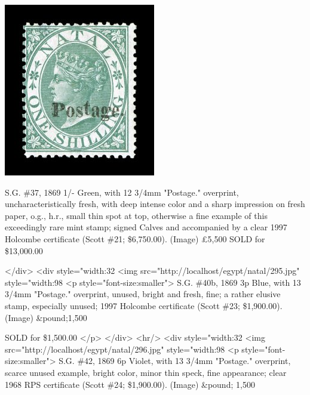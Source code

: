 \begin{marginfigure}
\centering
\includegraphics[width=.80\textwidth]{../natal/294.jpg}
\caption{ 
S.G. \#37, 1869 1/- Green, with 12 3/4mm "Postage." overprint, uncharacteristically fresh, with deep intense color and a sharp impression on fresh paper, o.g., h.r., small thin spot at top, otherwise a fine example of this exceedingly rare mint stamp; signed Calves and accompanied by a clear 1997 Holcombe certificate (Scott \#21; \$6,750.00). (Image) \pounds 5,500
SOLD for \$13,000.00 
}
\end{marginfigure}





</div>
<div style="width:32%
<img src="http://localhost/egypt/natal/295.jpg" style="width:98%
<p style="font-size:smaller"> 
S.G. \#40b, 1869 3p Blue, with 13 3/4mm "Postage." overprint, unused, bright and fresh, fine; a rather elusive stamp, especially unused; 1997 Holcombe certificate (Scott \#23; \$1,900.00). (Image) 	&pound;1,500

SOLD for \$1,500.00	
</p>
</div>
<hr/>
<div style="width:32%
<img src="http://localhost/egypt/natal/296.jpg" style="width:98%
<p style="font-size:smaller"> 
S.G. \#42, 1869 6p Violet, with 13 3/4mm "Postage." overprint, scarce unused example, bright color, minor thin speck, fine appearance; clear 1968 RPS certificate (Scott \#24; \$1,900.00). (Image) 	&pound; 1,500

